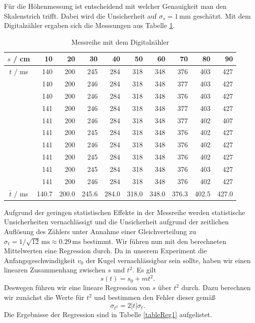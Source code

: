 \documentclass[a4paper, 12pt]{scrartcl}
\begin{document}
Für die Höhenmessung ist entscheidend mit welcher Genauigkeit man den Skalenstrich trifft. Dabei wird die Unsicherheit auf $\sigma_s = 1 \, \mathrm{mm}$ geschätzt. Mit dem Digitalzähler ergaben sich die Messsungen aus Tabelle \ref{tableDz}.

\begin{table}[h]
\begin{center}
\begin{tabular}{c|r|r|r|r|r|r|r|r|r}
$s$ / cm & 10 & 20 & 30 & 40 & 50 & 60 & 70 & 80 & 90 \\
\hline
$t$ / ms & 140 & 200 & 245 & 284 & 318 & 348 & 376 & 403 & 427 \\
         & 140 & 200 & 246 & 284 & 318 & 348 & 377 & 403 & 427 \\
	 & 140 & 200 & 246 & 284 & 318 & 348 & 376 & 403 & 427 \\
	 & 141 & 200 & 246 & 284 & 318 & 348 & 377 & 403 & 427 \\
	 & 141 & 200 & 246 & 284 & 318 & 348 & 377 & 402 & 407 \\
	 & 141 & 200 & 245 & 284 & 318 & 348 & 376 & 402 & 427 \\
	 & 141 & 200 & 246 & 284 & 318 & 348 & 376 & 402 & 427 \\
	 & 141 & 200 & 245 & 284 & 318 & 348 & 376 & 402 & 427 \\
	 & 141 & 200 & 245 & 284 & 318 & 348 & 376 & 403 & 427 \\
	 & 141 & 200 & 246 & 284 & 318 & 348 & 376 & 402 & 427 \\
\hline
$\bar t$ / ms & 140.7 & 200.0 & 245.6 & 284.0 & 318.0 & 348.0 & 376.3 & 402.5 & 427.0
\end{tabular}
\caption{Messreihe mit dem Digitalzähler}
\label{tableDz}
\end{center}
\end{table}

Aufgrund der geringen statistischen Effekte in der Messreihe werden statistische Unsicherheiten vernachlässigt und die Unsicherheit aufgrund der zeitlichen Auflösung des Zählers unter Annahme einer Gleichverteilung zu $\sigma_t = 1/\sqrt{12} \, \mathrm{ms} \approx 0.29 \, \mathrm{ms}$ bestimmt. Wir führen nun mit den berechneten Mittelwerten eine Regression durch. Da in unserem Experiment die Anfangsgeschwindigkeit $v_0$ der Kugel vernachlässigbar sein sollte, haben wir einen linearen Zusammenhang zwischen $s$ und $t^2$. Es gilt
$$s(t) = s_0 + mt^2.$$
Deswegen führen wir eine lineare Regression von $s$ über $t^2$ durch. Dazu berechnen wir zunächst die Werte für $t^2$ und bestimmen den Fehler dieser gemäß
$$\sigma_{t^2} = 2|t|\sigma_t.$$
Die Ergebnisse der Regression sind in Tabelle \ref{tableReg1} aufgelistet.
\end{document}
